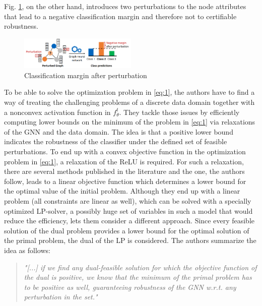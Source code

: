 \documentclass[a4paper,preprint]{sig-alternate}
\begin{document}
\vfill
\pagebreak

Fig. \ref{fig:after_pert}, on the other hand, introduces two perturbations to the node attributes that lead to a negative
classification margin and therefore not to certifiable robustness.

\begin{figure}[h]
    \centering
    \includegraphics[width=0.5\textwidth]{img/after_pert.png}
    \caption{Classification margin after perturbation \cite{Zuegner_2019}}
    \label{fig:after_pert}
\end{figure}

To be able to solve the optimization problem in \ref{eq:1}, the authors have to find a way of treating the challenging
problems of a discrete data domain together with a nonconvex activation function in $f_{\theta}^t$. \cite{Zuegner_2019}
They tackle those issues by efficiently computing lower bounds on the minimum of the problem in \ref{eq:1} via relaxations 
of the GNN and the data domain. The idea is that a positive lower bound indicates the robustness of the classifier under 
the defined set of feasible perturbations.
To end up with a convex objective function in the optimization problem in \ref{eq:1}, a relaxation of the ReLU is required. \cite{Zuegner_2019} 
For such a relaxation, there are several methods published in the literature and the one, the authors follow,
leads to a linear objective function which determines a lower bound for the optimal value of the initial problem.
Although they end up with a linear problem (all constraints are linear as well), which can be solved with a specially optimized LP-solver,
a possibly huge set of variables in such a model that would reduce the efficiency, lets them consider a different approach.
Since every feasible solution of the dual problem provides a lower bound for the optimal solution of the primal problem, 
the dual of the LP is considered. \cite{Zuegner_2019} The authors summarize the idea as follows:
\begin{quote}
    \emph{"[...] if we find any dual-feasible solution for which the objective function of the dual is positive, we know that the minimum of 
    the primal problem has to be positive as well, guaranteeing robustness of the GNN w.r.t. any perturbation in the set."} \cite{Zuegner_2019}
\end{quote}
\end{document}
